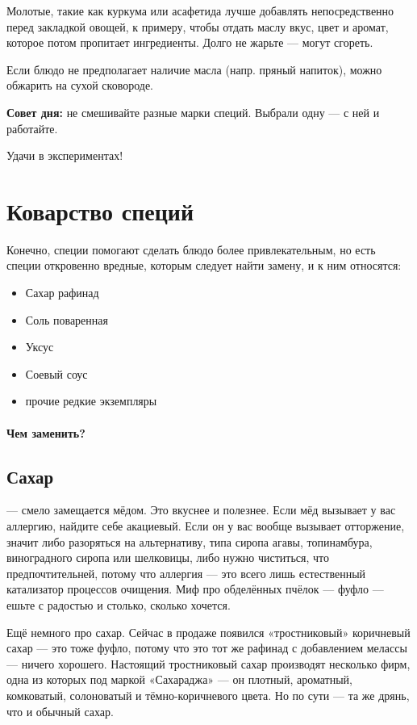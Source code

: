 Молотые, такие как куркума или асафетида лучше добавлять непосредственно перед закладкой овощей, к примеру, чтобы отдать маслу вкус, цвет и аромат, которое потом пропитает ингредиенты. Долго не жарьте — могут сгореть.

Если блюдо не предполагает наличие масла (напр. пряный напиток), можно обжарить на сухой сковороде.

\textbf{Совет дня:} не смешивайте разные марки специй. Выбрали одну — с ней и работайте.

Удачи в экспериментах!


\section{Коварство специй}

Конечно, специи помогают сделать блюдо более привлекательным, но есть специи откровенно вредные, которым следует найти замену, и к ним относятся:
\begin{itemize}
\item Сахар рафинад
\item Соль поваренная
\item Уксус
\item Соевый соус
\item прочие редкие экземпляры
\end{itemize}

\paragraph{Чем заменить?}

\subsection{Сахар}

— смело замещается мёдом. Это вкуснее и полезнее.
Если мёд вызывает у вас аллергию, найдите себе акациевый. Если он у вас вообще вызывает отторжение, значит либо разоряться на альтернативу, типа сиропа агавы, топинамбура, виноградного сиропа или шелковицы, либо нужно чиститься, что предпочтительней, потому что аллергия — это всего лишь естественный катализатор процессов очищения. Миф про обделённых пчёлок — фуфло — ешьте с радостью и столько, сколько хочется.

Ещё немного про сахар. Сейчас в продаже появился «тростниковый» коричневый сахар — это тоже фуфло, потому что это тот же рафинад с добавлением мелассы — ничего хорошего. Настоящий тростниковый сахар производят несколько фирм, одна из которых под маркой «Сахараджа» — он плотный, ароматный, комковатый, солоноватый и тёмно-коричневого цвета. Но по сути — та же дрянь, что и обычный сахар.


